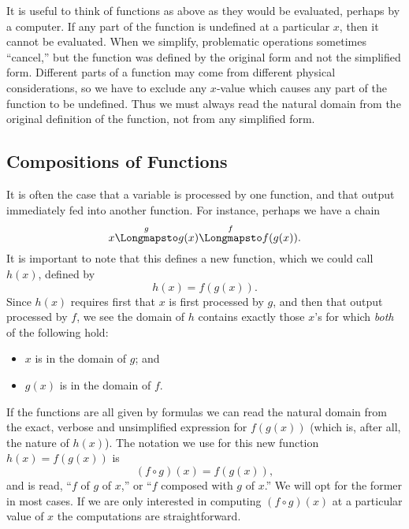 \eex
It is useful to think of functions as above as they would
be evaluated, perhaps by a computer.  If any part of the function
is undefined at a particular $x$, then it cannot be evaluated.
When we simplify,  problematic operations sometimes ``cancel,'' but the
function was defined by the original form and not the simplified
form.  Different parts of a function may come from different
physical considerations, so we have to  exclude any $x$-value
which causes any part of the function to be undefined.  
Thus we must always read the natural
domain from the original definition of the function,
not from any simplified form.

\subsection{Compositions of Functions}
It is often the case that a variable is processed by
one function, and that output immediately fed into 
another function.  For instance, perhaps
we have a chain 
\begin{equation}x\overset{g}{%
\Longmapsto
}g(x)\overset{f}{%
\Longmapsto
}
f(g(x)).\label{FirstChainOfFunctions}\end{equation}
It is important to note that this defines a new function,
which we could call $h(x)$, defined by 
\begin{equation}
h(x)=f(g(x)).
\label{RenameFirstChainOfFunctions}\end{equation}
Since $h(x)$ requires first that $x$ is first processed by $g$, and
then that output processed by $f$, we see the domain of 
$h$ contains exactly those
$x$'s for which {\it both} of the following hold:
\begin{itemize}
\item $x$ is in the domain of $g$; and
\item $g(x)$ is in the domain of $f$.
\end{itemize}
If the functions are all given by formulas we can read 
the natural domain from the exact, verbose and unsimplified 
expression for $f(g(x))$ (which is, after all, the nature of $h(x)$).
The notation we use for this new function $h(x)=f(g(x))$ is
\begin{equation} (f\circ g)(x)=f(g(x)),
\end{equation}
and is read, ``$f$ of $g$ of $x$,'' or ``$f$ composed with $g$ of $x$.''
We will opt for the former in most cases.  If we are only interested
in computing $(f\circ g)(x)$ at a particular value of $x$
the computations are straightforward.

